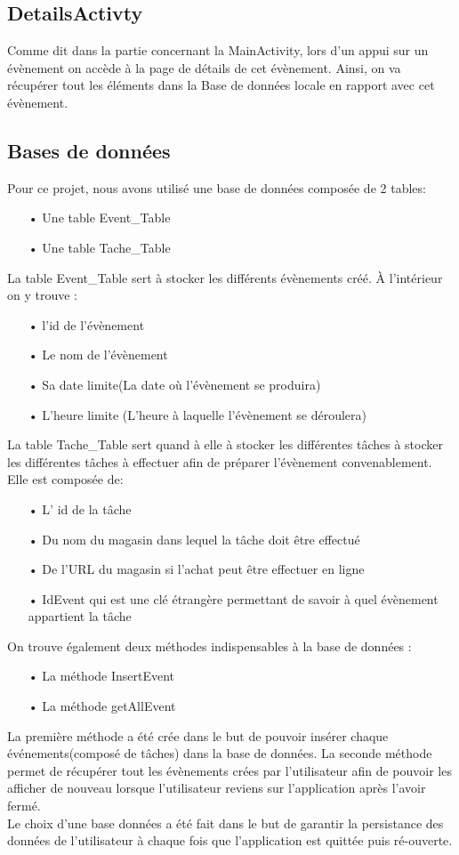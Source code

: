 \documentclass[12pt,a4paper]{report}
\begin{document}
\subsection{DetailsActivty}
\begin{flushleft}
\justify
Comme dit dans la partie concernant la MainActivity, lors d'un appui sur un évènement on accède à la page de détails de cet évènement. Ainsi, on va récupérer tout les éléments dans la Base de données locale en rapport avec cet évènement.
\end{flushleft}
\subsection{Bases de données}
\begin{flushleft}
\justify
Pour ce projet, nous avons utilisé une base de données composée de 2 tables:
\begin{itemize}
\item[•] Une table Event\_Table
\item[•] Une table Tache\_Table
\end{itemize}
\medskip
La table Event\_Table sert à stocker les différents évènements créé. À l'intérieur on y trouve :
\begin{itemize}
\item[•] l'id de l'évènement
\item[•] Le nom de l'évènement
\item[•] Sa date limite(La date où l'évènement se produira)
\item[•] L'heure limite (L'heure à laquelle l'évènement se déroulera)
\end{itemize}
\medskip 
La table Tache\_Table sert quand à elle à stocker les différentes tâches à stocker les différentes tâches à effectuer afin de préparer l'évènement convenablement. Elle est composée de:
\begin{itemize}
\item[•] L' id de la tâche
\item[•] Du nom du magasin dans lequel la tâche doit être effectué
\item[•] De l'URL du magasin si l'achat peut être effectuer en ligne
\item[•] IdEvent qui est une clé étrangère permettant de savoir à quel évènement appartient la tâche
\end{itemize}
\medskip 
On trouve également deux méthodes indispensables à la base de données :
\begin{itemize}
\item[•] La méthode InsertEvent
\item[•] La méthode getAllEvent
\end{itemize}
\medskip 
La première méthode a été crée dans le but de pouvoir insérer chaque événements(composé de tâches) dans la base de données. La seconde méthode permet de récupérer tout les évènements crées par l'utilisateur afin de pouvoir les afficher de nouveau lorsque l'utilisateur reviens sur l'application après l'avoir fermé. \\
Le choix d'une base données a été fait dans le but de garantir la persistance des données de l'utilisateur à chaque fois que l'application est quittée puis ré-ouverte.


\end{flushleft}
\end{document}
